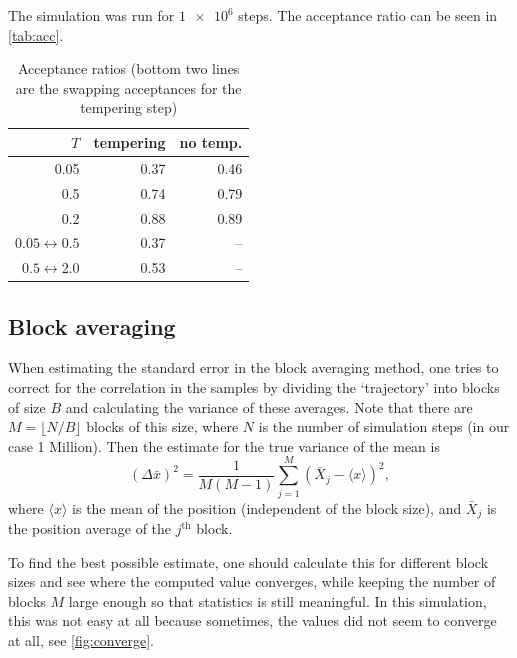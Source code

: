 \documentclass[11pt]{article}
\newcommand{\super}[1]{^{\text{#1}}}
\begin{document}
The simulation was run for $\num{1e6}$ steps. The acceptance ratio can be seen in \autoref{tab:acc}.

\begin{table}
	\centering
		\caption{Acceptance ratios (bottom two lines are the swapping acceptances for the tempering step)}
	\label{tab:acc}
	\begin{tabular}{r r r}\hline
		$T$ & tempering & no temp.\\\hline\hline
		0.05 & 0.37 & 0.46\\
		0.5 & 0.74 & 0.79\\
		0.2 & 0.88 & 0.89\\\hline
		$0.05 \leftrightarrow 0.5$ & 0.37 & -- \\
		$0.5 \leftrightarrow 2.0$ & 0.53 & --\\\hline\hline
	\end{tabular}

\end{table}

\subsection{Block averaging}

When estimating the standard error in the block averaging method, one tries to correct for the correlation in the samples by dividing the `trajectory' into blocks of size $B$ and calculating the variance of these averages. Note that there are $M = \lfloor N / B\rfloor$ blocks of this size, where $N$ is the number of simulation steps (in our case 1 Million).
Then the estimate for the true variance of the mean is
\begin{equation}
	(\Delta\bar x)^2 = \frac{1}{M(M-1)}\sum_{j=1}^M (\bar X_j - \langle x\rangle)^2,
\end{equation}
where $\langle x\rangle$ is the mean of the position (independent of the block size), and $\bar X_j$ is the position average of the $j\super{th}$ block.

To find the best possible estimate, one should calculate this for different block sizes and see where the computed value converges, while keeping the number of blocks $M$ large enough so that statistics is still meaningful.
In this simulation, this was not easy at all because sometimes, the values did not seem to converge at all, see \autoref{fig:converge}.
\end{document}
